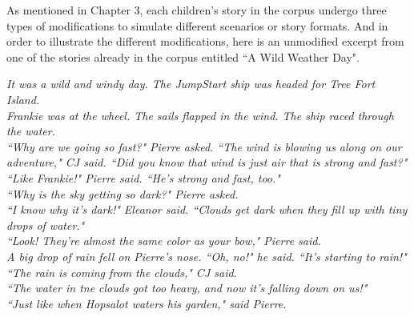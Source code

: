 %
%
%                 

\label{sec:appendixc}

As mentioned in Chapter 3, each children's story in the corpus undergo three types of modifications to simulate different scenarios or story formats. And in order to illustrate the different modifications, here is an unmodified excerpt from one of the stories already in the corpus entitled ``A Wild Weather Day".

	\noindent
	\hspace{1 in}\emph{It was a wild and windy day. The JumpStart ship was headed for Tree Fort Island.} \\
	\hspace*{1 in}\emph{Frankie was at the wheel. The sails flapped in the wind. The ship raced through the water.} \\
	\hspace*{1 in}\emph{``Why are we going so fast?" Pierre asked. ``The wind is blowing us along on our adventure," CJ said. ``Did you know that wind is just air that is strong and fast?"} \\
	\hspace*{1 in}\emph{``Like Frankie!" Pierre said. ``He's strong and fast, too."} \\
	\hspace*{1 in}\emph{``Why is the sky getting so dark?" Pierre asked.}\\
	\hspace*{1 in}\emph{``I know why it's dark!" Eleanor said. ``Clouds get dark when they fill up with tiny drops of water."} \\
	\hspace*{1 in}\emph{``Look! They're almost the same color as your bow," Pierre said.} \\
	\hspace*{1 in}\emph{A big drop of rain fell on Pierre's nose. ``Oh, no!" he said. ``It's starting to rain!"} \\
	\hspace*{1 in}\emph{``The rain is coming from the clouds," CJ said.} \\
	\hspace*{1 in}\emph{``The water in tne clouds got too heavy, and now it's falling down on us!"} \\
	\hspace*{1 in}\emph{``Just like when Hopsalot waters his garden," said Pierre.} \\

